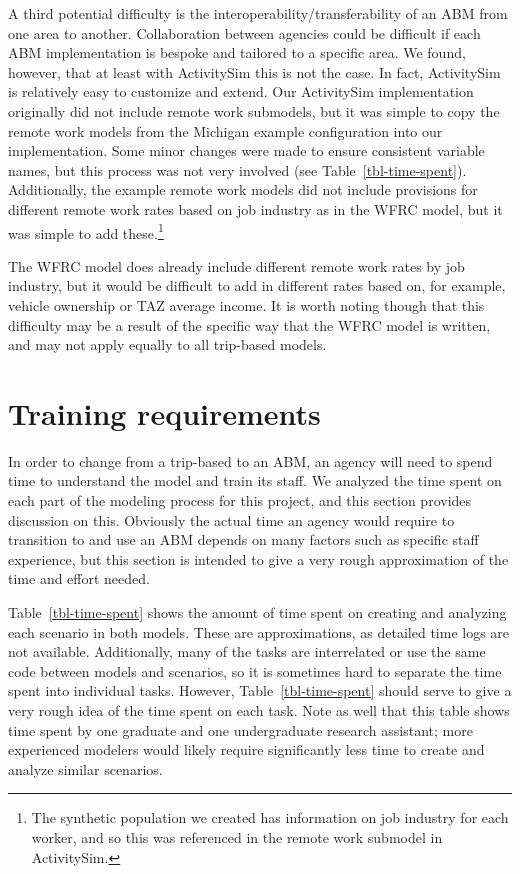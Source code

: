 \documentclass[fancy, twoside, mastersfancy, ms]{byuthesis}
\begin{document}
A third potential difficulty is the interoperability/transferability of
an ABM from one area to another. Collaboration between agencies could be
difficult if each ABM implementation is bespoke and tailored to a
specific area. We found, however, that at least with ActivitySim this is
not the case. In fact, ActivitySim is relatively easy to customize and
extend. Our ActivitySim implementation originally did not include remote
work submodels, but it was simple to copy the remote work models from
the Michigan example configuration into our implementation. Some minor
changes were made to ensure consistent variable names, but this process
was not very involved (see Table~\ref{tbl-time-spent}). Additionally,
the example remote work models did not include provisions for different
remote work rates based on job industry as in the WFRC model, but it was
simple to add these.\footnote{The synthetic population we created has
  information on job industry for each worker, and so this was
  referenced in the remote work submodel in ActivitySim.}

The WFRC model does already include different remote work rates by job
industry, but it would be difficult to add in different rates based on,
for example, vehicle ownership or TAZ average income. It is worth noting
though that this difficulty may be a result of the specific way that the
WFRC model is written, and may not apply equally to all trip-based
models.

\section{Training requirements}\label{training-requirements}

In order to change from a trip-based to an ABM, an agency will need to
spend time to understand the model and train its staff. We analyzed the
time spent on each part of the modeling process for this project, and
this section provides discussion on this. Obviously the actual time an
agency would require to transition to and use an ABM depends on many
factors such as specific staff experience, but this section is intended
to give a very rough approximation of the time and effort needed.

Table~\ref{tbl-time-spent} shows the amount of time spent on creating
and analyzing each scenario in both models. These are approximations, as
detailed time logs are not available. Additionally, many of the tasks
are interrelated or use the same code between models and scenarios, so
it is sometimes hard to separate the time spent into individual tasks.
However, Table~\ref{tbl-time-spent} should serve to give a very rough
idea of the time spent on each task. Note as well that this table shows
time spent by one graduate and one undergraduate research assistant;
more experienced modelers would likely require significantly less time
to create and analyze similar scenarios.
\end{document}

